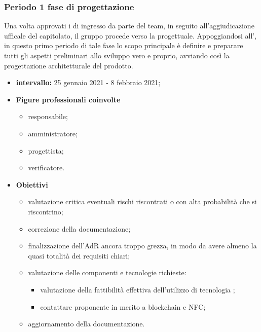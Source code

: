        \subsubsection{Periodo 1 fase di progettazione}
        Una volta approvati i  di ingresso da parte del team, in seguito all'aggiudicazione ufficale del capitolato, il gruppo procede verso la  progettuale. Appoggiandosi all'\AdR{}, in questo primo periodo di tale fase lo scopo principale è definire e preparare tutti gli aspetti preliminari allo sviluppo vero e proprio, avviando così la progettazione architetturale del prodotto.
        \begin{itemize}
                \item \textbf{intervallo: } 25 gennaio 2021 - 8 febbraio 2021;
                \item  \textbf{Figure professionali coinvolte}
                \begin{itemize}
                    \item responsabile;
                    \item amministratore;
                    \item progettista;
                    \item verificatore.
                \end{itemize}
                \item \textbf{Obiettivi}
                \begin{itemize}
                    \item valutazione critica eventuali rischi riscontrati o con alta probabilità che si riscontrino;
                    \item correzione della documentazione;
                    \item finalizzazione dell'AdR ancora troppo grezza, in modo da avere almeno la quasi totalità dei requisiti chiari;
                    \item valutazione delle componenti e tecnologie richieste:
                    \begin{itemize}
                        \item valutazione della fattibilità effettiva dell'utilizzo di tecnologia ;
                        \item contattare proponente in merito a blockchain e NFC;
                    \end{itemize}

                    \item aggiornamento della documentazione.
                    
                \end{itemize}
        \end{itemize}


